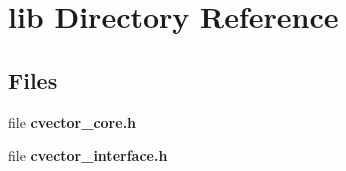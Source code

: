 \section{lib Directory Reference}
\label{dir_97aefd0d527b934f1d99a682da8fe6a9}
\subsection*{Files}
\begin{DoxyCompactItemize}
\item 
file \textbf{ cvector\+\_\+core.\+h}
\item 
file \textbf{ cvector\+\_\+interface.\+h}
\end{DoxyCompactItemize}
